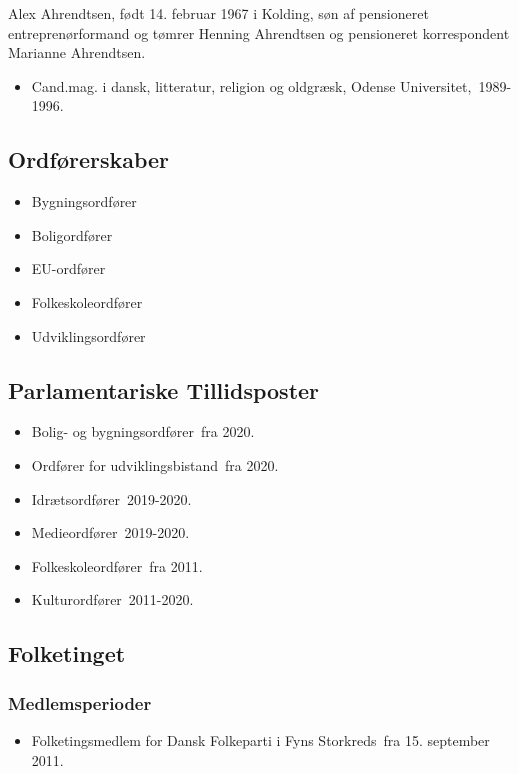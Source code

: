 \documentclass[11pt, a4paper]{awesome-cv}
\begin{document}
\makecvheader[R]
\makelettertitle
\begin{cvletter}
Alex Ahrendtsen, født 14. februar 1967 i Kolding, søn af pensioneret entreprenørformand og tømrer Henning Ahrendtsen og pensioneret korrespondent Marianne Ahrendtsen.

\begin{itemize}
\item Cand.mag. i dansk, litteratur, religion og oldgræsk, Odense Universitet, 1989-1996.
\end{itemize}
\subsection*{Ordførerskaber}
\begin{itemize}
\item Bygningsordfører
\item Boligordfører
\item EU-ordfører
\item Folkeskoleordfører
\item Udviklingsordfører
\end{itemize}
\subsection*{Parlamentariske Tillidsposter}
\begin{itemize}
\item Bolig- og bygningsordfører fra 2020.
\item Ordfører for udviklingsbistand fra 2020.
\item Idrætsordfører 2019-2020.
\item Medieordfører 2019-2020.
\item Folkeskoleordfører fra 2011.
\item Kulturordfører 2011-2020.
\end{itemize}
\subsection*{Folketinget}
\subsubsection*{Medlemsperioder}
\begin{itemize}
\item Folketingsmedlem for Dansk Folkeparti i Fyns Storkreds fra 15. september 2011.
\end{itemize}

\end{cvletter}
\end{document}
